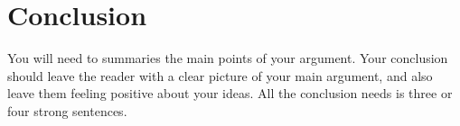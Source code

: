 \chapter*{Conclusion}
You will need to summaries the main points of your argument. Your conclusion should leave the reader with a clear picture of your main argument, and also leave them feeling positive about your ideas. All the conclusion needs is three or four strong sentences. 